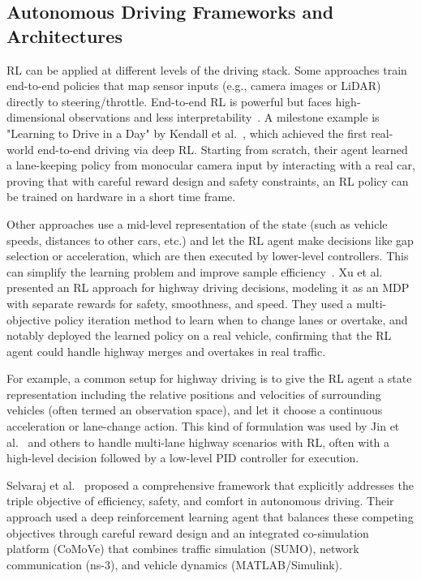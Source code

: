 \documentclass[12pt,a4paper]{article}
\begin{document}
\subsection{Autonomous Driving Frameworks and Architectures}
RL can be applied at different levels of the driving stack. Some approaches train end-to-end policies that map sensor inputs (e.g., camera images or LiDAR) directly to steering/throttle. End-to-end RL is powerful but faces high-dimensional observations and less interpretability~\cite{survey2023}. A milestone example is "Learning to Drive in a Day" by Kendall et al.~\cite{kendall2019}, which achieved the first real-world end-to-end driving via deep RL. Starting from scratch, their agent learned a lane-keeping policy from monocular camera input by interacting with a real car, proving that with careful reward design and safety constraints, an RL policy can be trained on hardware in a short time frame.

Other approaches use a mid-level representation of the state (such as vehicle speeds, distances to other cars, etc.) and let the RL agent make decisions like gap selection or acceleration, which are then executed by lower-level controllers. This can simplify the learning problem and improve sample efficiency~\cite{survey2023}. Xu et al.~\cite{xu2018} presented an RL approach for highway driving decisions, modeling it as an MDP with separate rewards for safety, smoothness, and speed. They used a multi-objective policy iteration method to learn when to change lanes or overtake, and notably deployed the learned policy on a real vehicle, confirming that the RL agent could handle highway merges and overtakes in real traffic.

For example, a common setup for highway driving is to give the RL agent a state representation including the relative positions and velocities of surrounding vehicles (often termed an observation space), and let it choose a continuous acceleration or lane-change action. This kind of formulation was used by Jin et al.~\cite{jin2025} and others to handle multi-lane highway scenarios with RL, often with a high-level decision followed by a low-level PID controller for execution.

Selvaraj et al.~\cite{selvaraj2023} proposed a comprehensive framework that explicitly addresses the triple objective of efficiency, safety, and comfort in autonomous driving. Their approach used a deep reinforcement learning agent that balances these competing objectives through careful reward design and an integrated co-simulation platform (CoMoVe) that combines traffic simulation (SUMO), network communication (ns-3), and vehicle dynamics (MATLAB/Simulink).
\end{document}
